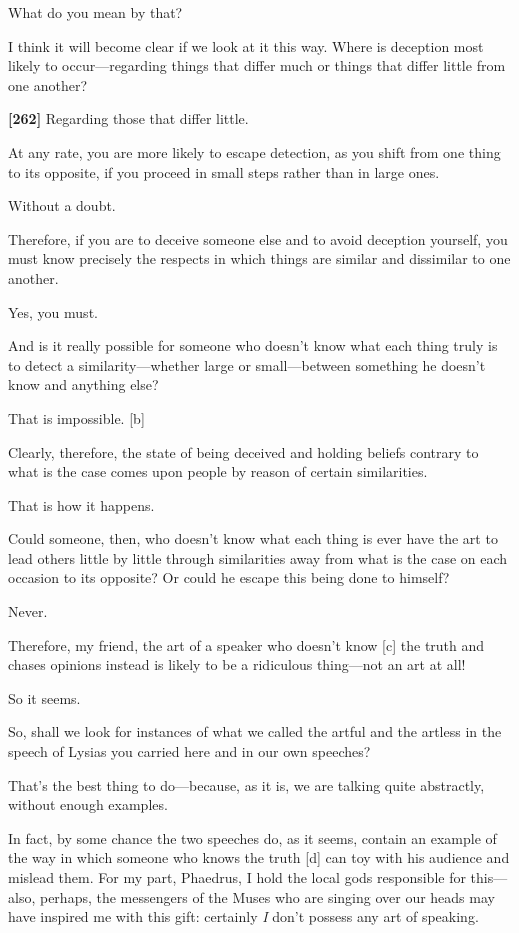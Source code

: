\sayphaedrus What do you mean by that?

\saysocrates I think it will become clear if we look at it this way. Where
is deception most likely to occur---regarding things that differ much or
things that differ little from one another?

{\bf {[}262{]}} \sayphaedrus Regarding those that differ little.

\saysocrates At any rate, you are more likely to escape detection, as you
shift from one thing to its opposite, if you proceed in small steps
rather than in large ones.

\sayphaedrus Without a doubt.

\saysocrates Therefore, if you are to deceive someone else and to avoid
deception yourself, you must know precisely the respects in which things
are similar and dissimilar to one another.

\sayphaedrus Yes, you must.

\saysocrates And is it really possible for someone who doesn't know what
each thing truly is to detect a similarity---whether large or
small---between something he doesn't know and anything else?

\sayphaedrus That is impossible. {[}b{]}

\saysocrates Clearly, therefore, the state of being deceived and holding
beliefs contrary to what is the case comes upon people by reason of
certain similarities.

\sayphaedrus That is how it happens.

\saysocrates Could someone, then, who doesn't know what each thing is ever
have the art to lead others little by little through similarities away
from what is the case on each occasion to its opposite? Or could he
escape this being done to himself?

\sayphaedrus Never.

\saysocrates Therefore, my friend, the art of a speaker who doesn't know
{[}c{]} the truth and chases opinions instead is likely to be a
ridiculous thing---not an art at all!

\sayphaedrus So it seems.

\saysocrates So, shall we look for instances of what we called the artful
and the artless in the speech of Lysias you carried here and in our own
speeches?

\sayphaedrus That's the best thing to do---because, as it is, we are
talking quite abstractly, without enough examples.

\saysocrates In fact, by some chance the two speeches do, as it seems,
contain an example of the way in which someone who knows the truth
{[}d{]} can toy with his audience and mislead them. For my part,
Phaedrus, I hold the local gods responsible for this---also, perhaps,
the messengers of the Muses who are singing over our heads may have
inspired me with this gift: certainly {\em I} don't possess any art of
speaking.

